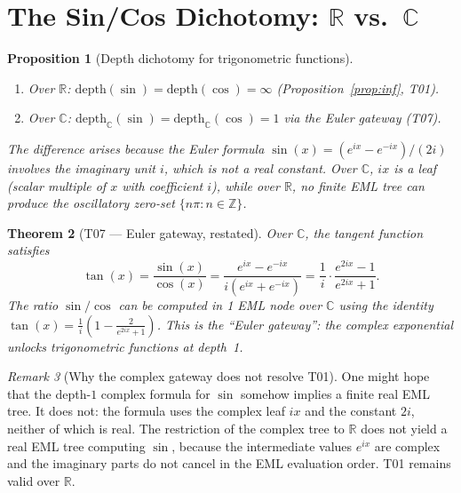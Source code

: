 \documentclass[12pt,a4paper]{article}
\newtheorem{theorem}{Theorem}[section]
\newtheorem{proposition}[theorem]{Proposition}
\theoremstyle{definition}
\theoremstyle{remark}
\newtheorem{remark}[theorem]{Remark}
\begin{document}
\section{The Sin/Cos Dichotomy: $\mathbb{R}$ vs.\ $\mathbb{C}$}

\begin{proposition}[Depth dichotomy for trigonometric functions]\label{prop:trig}
\mbox{}
\begin{enumerate}
\item Over $\mathbb{R}$: $\mathrm{depth}(\sin)=\mathrm{depth}(\cos)=\infty$
      (Proposition~\ref{prop:inf}, T01).
\item Over $\mathbb{C}$: $\mathrm{depth}_\mathbb{C}(\sin)=\mathrm{depth}_\mathbb{C}(\cos)=1$
      via the Euler gateway (T07).
\end{enumerate}
The difference arises because the Euler formula
$\sin(x)=(e^{ix}-e^{-ix})/(2i)$ involves the imaginary unit $i$, which is
not a real constant.  Over $\mathbb{C}$, $ix$ is a leaf (scalar multiple of
$x$ with coefficient $i$), while over $\mathbb{R}$, no finite EML tree can
produce the oscillatory zero-set $\{n\pi : n\in\mathbb{Z}\}$.
\end{proposition}

\begin{theorem}[T07 — Euler gateway, restated]\label{thm:T07}
Over $\mathbb{C}$, the tangent function satisfies
\[
  \tan(x) = \frac{\sin(x)}{\cos(x)} = \frac{e^{ix}-e^{-ix}}{i(e^{ix}+e^{-ix})}
  = \frac{1}{i}\cdot\frac{e^{2ix}-1}{e^{2ix}+1}.
\]
The ratio $\sin/\cos$ can be computed in 1 EML node over $\mathbb{C}$ using
the identity $\tan(x)=\frac{1}{i}(1-\frac{2}{e^{2ix}+1})$.  This is the
``Euler gateway'': the complex exponential unlocks trigonometric functions
at depth~1.
\end{theorem}

\begin{remark}[Why the complex gateway does not resolve T01]
One might hope that the depth-$1$ complex formula for $\sin$ somehow implies
a finite real EML tree.  It does not: the formula uses the complex leaf $ix$
and the constant $2i$, neither of which is real.  The restriction of the
complex tree to $\mathbb{R}$ does not yield a real EML tree computing $\sin$,
because the intermediate values $e^{ix}$ are complex and the imaginary parts
do not cancel in the EML evaluation order.  T01 remains valid over $\mathbb{R}$.
\end{remark}
\end{document}
